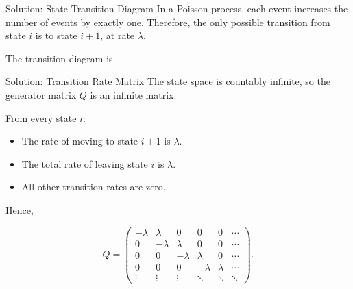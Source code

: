 \documentclass[
  ignorenonframetext,
  aspectratio=169,
]{beamer}
\providecommand{\tightlist}{%
  \setlength{\itemsep}{0pt}\setlength{\parskip}{0pt}}
\begin{document}
\begin{frame}{Solution: State Transition Diagram}
\protect{}\label{solution-state-transition-diagram}
In a Poisson process, each event increases the number of events by
exactly one. Therefore, the only possible transition from state \(i\) is
to state \(i+1\), at rate \(\lambda\).

The transition diagram is

\begin{center}
\end{center}
\end{frame}

\begin{frame}{Solution: Transition Rate Matrix}
\protect{}\label{solution-transition-rate-matrix-2}
The state space is countably infinite, so the generator matrix \(Q\) is
an infinite matrix.

From every state \(i\):

\begin{itemize}
\tightlist
\item
  The rate of moving to state \(i+1\) is \(\lambda\).
\item
  The total rate of leaving state \(i\) is \(\lambda\).
\item
  All other transition rates are zero.
\end{itemize}

Hence,

\[
\boxed{
Q=
\begin{pmatrix}
-\lambda & \lambda & 0 & 0 & 0 & \cdots\\
0 & -\lambda & \lambda & 0 & 0 & \cdots\\
0 & 0 & -\lambda & \lambda & 0 & \cdots\\
0 & 0 & 0 & -\lambda & \lambda & \cdots\\
\vdots & \vdots & \vdots & \ddots & \ddots & \ddots
\end{pmatrix}.
}
\]
\end{frame}
\end{document}
